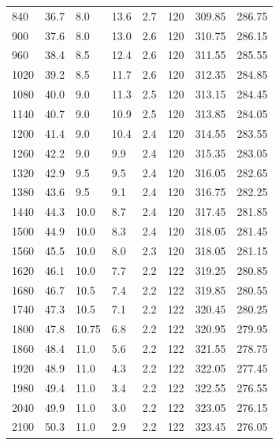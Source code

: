 \documentclass[titlepage=firstcover, captions=tableheading]{scrartcl}
\begin{document}
\begin{minipage}{\linewidth}
\begin{center}
\begin{tabular}{lllllllr}
            840 	&   36.7 & 8.0 &	13.6 &	2.7 &	120   & 309.85 & 286.75  \\
            900 	&   37.6 & 8.0 &	13.0 &	2.6 &	120   & 310.75 & 286.15  \\
            960 	&   38.4 & 8.5 & 	12.4 &	2.6 &	120   & 311.55 & 285.55  \\
            1020	&   39.2 & 8.5 & 	11.7 &	2.6 &	120   & 312.35 & 284.85  \\
            1080	&   40.0 & 9.0 & 	11.3 &	2.5 &	120   & 313.15 & 284.45  \\
            1140	&   40.7 & 9.0 & 	10.9 &	2.5 &	120   & 313.85 & 284.05  \\
            1200	&   41.4 & 9.0 & 	10.4 &	2.4 &	120   & 314.55 & 283.55  \\
            1260	&   42.2 & 9.0 & 	 9.9 &  2.4 &	120   & 315.35 & 283.05  \\
            1320	&   42.9 & 9.5 & 	 9.5 &	2.4 &   120   & 316.05 & 282.65  \\
            1380	&   43.6 & 9.5 & 	 9.1 &	2.4	&   120   & 316.75 & 282.25  \\
            1440	&   44.3 & 10.0 &	 8.7 &	2.4 &	120   & 317.45 & 281.85 \\
            1500	&   44.9 & 10.0 &	 8.3 &	2.4 &	120   & 318.05 & 281.45  \\
            1560	&   45.5 & 10.0 &	 8.0 &	2.3 &	120   & 318.05 & 281.15  \\
            1620	&   46.1 & 10.0 &	 7.7 &	2.2 &	122   & 319.25 & 280.85  \\
            1680	&   46.7 & 10.5 &	 7.4 &	2.2 &	122   & 319.85 & 280.55  \\
            1740	&   47.3 & 10.5 &	 7.1 &	2.2 &	122   & 320.45 & 280.25  \\
            1800	&   47.8 & 10.75 &	 6.8 &	2.2 &	122   & 320.95 & 279.95 \\
            1860	&   48.4 & 11.0 &	 5.6 &	2.2 &	122   & 321.55 & 278.75  \\
            1920	&   48.9 & 11.0 &	 4.3 &	2.2 &	122   & 322.05 & 277.45  \\
            1980	&   49.4 & 11.0 &	 3.4 &	2.2 &	122   & 322.55 & 276.55  \\
            2040	&   49.9 & 11.0 &	 3.0 &	2.2 &	122   & 323.05 & 276.15  \\
            2100	&   50.3 & 11.0 &	 2.9 &	2.2	&   122   & 323.45 & 276.05  \\
            \bottomrule
        \end{tabular}
    \end{center}
    
\end{minipage}  
\end{document}
